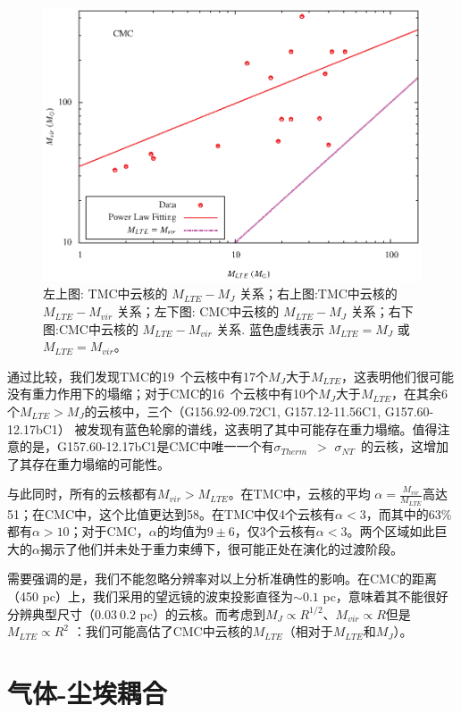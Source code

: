 \documentclass[UTF8, nocolorlinks]{pkuthss}
\newcommand{\sigmath}{$\sigma _{Therm}$\ }
\newcommand{\sigmant}{$\sigma _{NT}$\ }
\newcommand{\numcoretmc}{19\ }
\newcommand{\numcorecmc}{16\ }
\begin{document}
\begin{figure}[htbp]
			\includegraphics[totalheight=50mm]{img_plot/M_vir_cmc.eps}
			\caption{左上图: TMC中云核的 $M_{LTE}-M_{J}$ 关系；右上图:TMC中云核的 $M_{LTE}-M_{vir}$ 关系；左下图: CMC中云核的 $M_{LTE}-M_{J}$ 关系；右下图:CMC中云核的 $M_{LTE}-M_{vir}$ 关系.  蓝色虚线表示 $M_{LTE}=M_{J}$ 或 $M_{LTE}=M_{vir}$。\label{Fig.Mass}}
		\end{figure}

		通过比较，我们发现TMC的\numcoretmc 个云核中有17个$M_J$大于$M_{LTE}$，这表明他们很可能没有重力作用下的塌缩；对于CMC的\numcorecmc 个云核中有10个$M_J$大于$M_{LTE}$，在其余6个$M_{LTE}>M_J$的云核中，三个（G156.92-09.72C1, G157.12-11.56C1, G157.60-12.17bC1） 被发现有蓝色轮廓的谱线，这表明了其中可能存在重力塌缩。值得注意的是，G157.60-12.17bC1是CMC中唯一一个有\sigmath $>$ \sigmant 的云核，这增加了其存在重力塌缩的可能性。

		与此同时，所有的云核都有$M_{vir}>M_{LTE}$。在TMC中，云核的平均 $\alpha=\frac{M_{vir}}{M_{LTE}}$高达51；在CMC中，这个比值更达到58。在TMC中仅4个云核有$\alpha<3$，而其中的63\%都有$\alpha>10$；对于CMC，$\alpha$的均值为$9\pm6$，仅3个云核有$\alpha<3$。两个区域如此巨大的$\alpha$揭示了他们并未处于重力束缚下，很可能正处在演化的过渡阶段。

		需要强调的是，我们不能忽略分辨率对以上分析准确性的影响。在CMC的距离（450 pc）上，我们采用的望远镜的波束投影直径为$\sim 0.1$ pc，意味着其不能很好分辨典型尺寸（$0.03~0.2$ pc）\supercite{2007ARA&A..45..339B}的云核。而考虑到$M_{J}\propto R^{1/2}$、$M_{vir}\propto R$但是 $M_{LTE}\propto R^2$ ：我们可能高估了CMC中云核的$M_{LTE}$（相对于$M_{LTE}$和$M_{J}$）。

	\section{气体-尘埃耦合}\label{Sec.GasDust}
\end{document}

